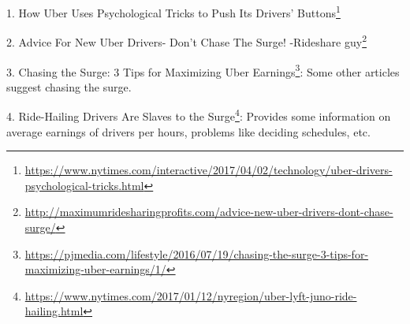 1. How Uber Uses Psychological Tricks to Push Its Drivers' Buttons\footnote{\url{https://www.nytimes.com/interactive/2017/04/02/technology/uber-drivers-psychological-tricks.html}}

2. Advice For New Uber Drivers- Don't Chase The Surge! -Rideshare guy\footnote{\url{http://maximumridesharingprofits.com/advice-new-uber-drivers-dont-chase-surge/}}

3. Chasing the Surge: 3 Tips for Maximizing Uber Earnings\footnote{\url{https://pjmedia.com/lifestyle/2016/07/19/chasing-the-surge-3-tips-for-maximizing-uber-earnings/1/}}: Some other articles suggest chasing the surge.

4. Ride-Hailing Drivers Are Slaves to the Surge\footnote{\url{https://www.nytimes.com/2017/01/12/nyregion/uber-lyft-juno-ride-hailing.html}}: Provides some information on average earnings of drivers per hours, problems like deciding schedules, etc.